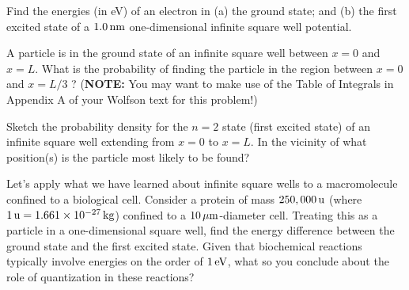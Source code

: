 
\begin{problem}
Find the energies (in eV) of an electron in (a) the ground
state; and (b) the first excited state of a $1.0 \,\mbox{nm}$ one-dimensional
infinite square well potential.
\label{prob:QuantumWire}
\end{problem}


\begin{problem}
A particle is in the ground state of an infinite square well between $x = 0$
and $x = L$.  What is the
probability of finding the particle in the region between $x=0$ and $x=
L/3$ ?  ({\bf NOTE:} You may want to make use of the Table of Integrals
in Appendix A of your Wolfson text for this problem!) 
\end{problem}



\begin{problem}
Sketch the probability density for the $n=2$ state (first excited state)
of an infinite square well
extending from $x=0$ to $x=L$. In the vicinity of what position(s) is 
the particle most likely to be found?
\label{prob:WhereInPInBox}
\end{problem}



\begin{problem}

Let's apply what we have learned about infinite square wells to a
macromolecule confined to a biological cell.  Consider a protein of mass
$250,000 \,\mbox{u}$ (where $1\,\mbox{u} = 1.661 \times 10^{-27}\,\mbox{kg}$)
confined to a $10 \,\mbox{$\mu$m}$-diameter cell.  Treating this as a
particle in a one-dimensional square well, find the energy difference
between the ground state and the first excited state.  Given that
biochemical reactions typically involve energies on the order of 
$1\,\mbox{eV}$, what so you conclude about the role of quantization in
these reactions?

\end{problem}

